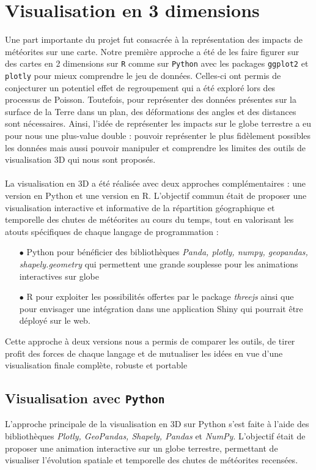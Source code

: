 \documentclass[12pt]{article}
\begin{document}
\section{Visualisation en 3 dimensions}
Une part importante du projet fut consacrée à la représentation des impacts de météorites sur une carte. Notre première approche a été de les faire figurer sur des cartes en 2 dimensions sur \texttt{R} comme sur \texttt{Python} avec les packages \texttt{ggplot2} et \texttt{plotly} pour mieux comprendre le jeu de données. Celles-ci ont permis de conjecturer un potentiel effet de regroupement qui a été exploré lors des processus de Poisson. Toutefois, pour représenter des données présentes sur la surface de la Terre dans un plan, des déformations des angles et des distances sont nécessaires. Ainsi, l'idée de représenter les impacts sur le globe terrestre a eu pour nous une plus-value double : pouvoir représenter le plus fidèlement possibles les données mais aussi pouvoir manipuler et comprendre les limites des outils de visualisation 3D qui nous sont proposés.\\
\\
La visualisation en 3D a été réalisée avec deux approches complémentaires : une version en Python et une version en R. L’objectif commun était de proposer une visualisation interactive  et informative de la répartition géographique et temporelle des chutes de météorites au cours du temps, tout  en valorisant les atouts spécifiques de chaque langage de programmation :\\
\begin{itemize}
    \item[$\bullet$] Python pour bénéficier des bibliothèques \textit{Panda, plotly, numpy, geopandas, shapely.geometry} qui permettent une grande souplesse pour les animations interactives sur
globe
    \item[$\bullet$] R pour exploiter les possibilités offertes par le package \textit{threejs} ainsi que pour envisager une intégration dans une application Shiny qui pourrait être déployé sur le web.
\end{itemize}

Cette approche à deux versions nous a permis de comparer les outils, de tirer profit des forces
de chaque langage et de mutualiser les idées en vue d’une visualisation finale complète,
robuste et portable

\subsection{Visualisation avec \texttt{Python}}
L’approche principale de la visualisation en 3D sur Python s’est faite à l’aide des bibliothèques \textit{Plotly, GeoPandas, Shapely, Pandas} et \textit{NumPy}. L'objectif était de proposer une animation interactive sur un globe terrestre, permettant de visualiser l’évolution spatiale et temporelle des chutes de météorites recensées.
\\
\end{document}
